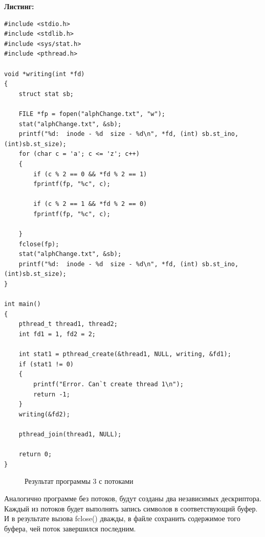 \documentclass[14pt, a4paper]{extarticle}
\begin{document}
\newpage
\textbf{Листинг:}
\begin{lstlisting}
#include <stdio.h>
#include <stdlib.h>
#include <sys/stat.h>
#include <pthread.h>

void *writing(int *fd)
{
	struct stat sb;
	
	FILE *fp = fopen("alphChange.txt", "w");
	stat("alphChange.txt", &sb);
	printf("%d:  inode - %d  size - %d\n", *fd, (int) sb.st_ino, (int)sb.st_size);
	for (char c = 'a'; c <= 'z'; c++)
	{
		if (c % 2 == 0 && *fd % 2 == 1)
		fprintf(fp, "%c", c);
		
		if (c % 2 == 1 && *fd % 2 == 0)
		fprintf(fp, "%c", c);
		
	}
	fclose(fp);
	stat("alphChange.txt", &sb);
	printf("%d:  inode - %d  size - %d\n", *fd, (int) sb.st_ino, (int)sb.st_size);
}

int main()
{
	pthread_t thread1, thread2;
	int fd1 = 1, fd2 = 2;
	
	int stat1 = pthread_create(&thread1, NULL, writing, &fd1);
	if (stat1 != 0)
	{
		printf("Error. Can`t create thread 1\n");
		return -1;
	}
	writing(&fd2);
	
	pthread_join(thread1, NULL);
	
	return 0;
}
	\end{lstlisting}

\begin{figure}[h!]
	\caption{Результат программы 3 с потоками}
\end{figure}\par

Аналогично программе без потоков, будут созданы два независимых
дескриптора. Каждый из потоков будет выполнять запись символов в
соответствующий буфер. И в результате вызова fclose() дважды, в файле
сохранить содержимое того буфера, чей поток завершился последним.
\end{document}
